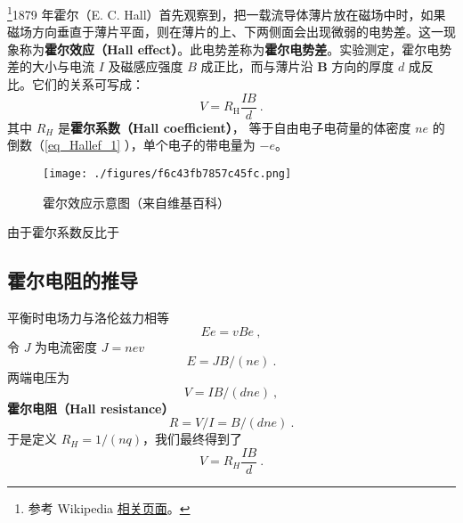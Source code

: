 

\footnote{参考 Wikipedia \href{https://en.wikipedia.org/wiki/Hall_effect}{相关页面}。}1879 年霍尔（E. C. Hall）首先观察到，把一载流导体薄片放在磁场中时，如果磁场方向垂直于薄片平面，则在薄片的上、下两侧面会出现微弱的电势差。这一现象称为\textbf{霍尔效应（Hall effect）}。此电势差称为\textbf{霍尔电势差}。实验测定，霍尔电势差的大小与电流 $I$ 及磁感应强度 $B$ 成正比，而与薄片沿 $\mathbf B$ 方向的厚度 $d$ 成反比。它们的关系可写成：
\begin{equation}
V = R_{\mathrm{H}} \frac{I B}{d}~.
\end{equation}
其中 $R_H$ 是\textbf{霍尔系数（Hall coefficient）}， 等于自由电子电荷量的体密度 $ne$ 的倒数（\autoref{eq_Hallef_1} ），单个电子的带电量为 $-e$。

\begin{figure}[ht]
\centering
\texttt{[image: ./figures/f6c43fb7857c45fc.png]}
\caption{霍尔效应示意图（来自维基百科）} \label{fig_Hallef_1}
\end{figure}

由于霍尔系数反比于

\subsection{霍尔电阻的推导}
平衡时电场力与洛伦兹力相等
\begin{equation}
Ee = vBe~,
\end{equation}
令 $J$ 为电流密度 $J=nev$
\begin{equation}
E = JB/(ne)~.
\end{equation}
两端电压为
\begin{equation}\label{eq_Hallef_1}
V = IB/(d n e)~,
\end{equation}
\textbf{霍尔电阻（Hall resistance）}
\begin{equation}\label{eq_Hallef_2}
R = V/I = B/(d n e)~.
\end{equation}
于是定义 $R_H=1/(nq)$，我们最终得到了
\begin{equation}
V=R_H\frac{IB}{d}~.
\end{equation}

